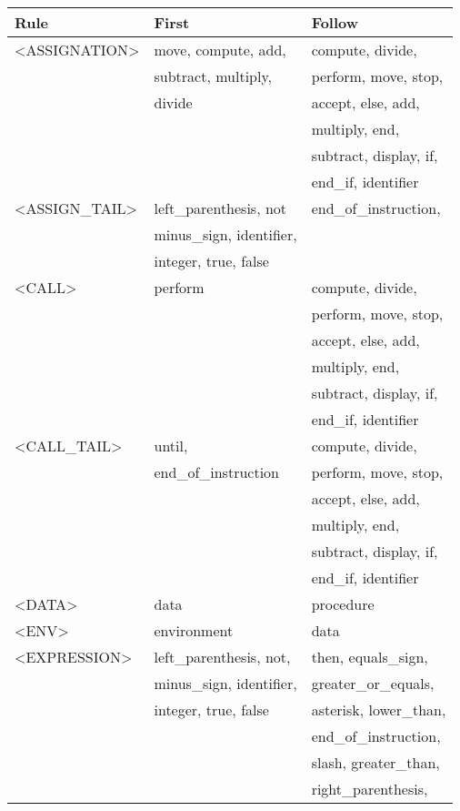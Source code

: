 \begin{longtable}{|l|l|l|}
\hline
Rule                 &   First                &   Follow               \\
\hline
<ASSIGNATION>  &  move, compute, add, &   compute, divide, \\ 
  &  subtract, multiply, &   perform, move, stop, \\ 
  &  divide &   accept, else, add, \\ 
  &  &   multiply, end, \\ 
  &  &   subtract, display, if, \\ 
  &  &   end\_if, identifier \\ 
  \hline
<ASSIGN\_TAIL>  &  left\_parenthesis, not &   end\_of\_instruction, \\ 
  &  minus\_sign, identifier, &   \\ 
  &  integer, true, false &   \\ 
  \hline
<CALL>  &  perform &   compute, divide, \\ 
  &  &   perform, move, stop, \\ 
  &  &   accept, else, add, \\ 
  &  &   multiply, end, \\ 
  &  &   subtract, display, if, \\ 
  &  &   end\_if, identifier \\ 
  \hline
<CALL\_TAIL>  &  until, &   compute, divide, \\ 
  &  end\_of\_instruction &   perform, move, stop, \\ 
  &  &   accept, else, add, \\ 
  &  &   multiply, end, \\ 
  &  &   subtract, display, if, \\ 
  &  &   end\_if, identifier \\ 
  \hline
<DATA>  &  data &   procedure \\ 
  \hline
<ENV>  &  environment &   data \\ 
  \hline
<EXPRESSION>  &  left\_parenthesis, not, &   then, equals\_sign, \\ 
  &  minus\_sign, identifier, &   greater\_or\_equals, \\ 
  &  integer, true, false &   asterisk, lower\_than, \\ 
  &  &   end\_of\_instruction, \\ 
  &  &   slash, greater\_than, \\ 
  &  &   right\_parenthesis, \\ 

\end{longtable}
